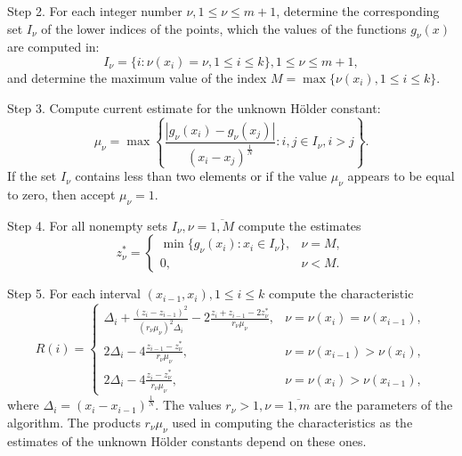 \documentclass[runningheads]{llncs}
\begin{document}
Step 2. For each integer number \(\nu ,1\leqslant \nu \leqslant m+1\), determine the corresponding
set \(I_{\nu }\) of the lower indices of the points, which the values of the functions \(g_{\nu
}(x)\) are computed in:
\begin{displaymath}
  I_{\nu }=\{i:\nu (x_{i})=\nu ,1\leqslant i\leqslant k\},1\leq \nu \leqslant m+1,
\end{displaymath}
and determine the maximum value of the index \(M=\max\{\nu (x_{i}),1\leq i\leq k\}\).

Step 3. Compute current estimate for the unknown H\"{o}lder constant:
\begin{equation}
  \label{step2}
  \mu _{\nu }=\max \left\{ \frac{|g_{\nu }(x_{i})-g_{\nu }(x_{j})|}{(x_{i}-
x_{j})^{\frac{1}{N}}}:i,j\in I_{\nu },i>j \right\}.
\end{equation}
If the set \(I_{\nu }\) contains less than two elements or if the value \(\mu _{\nu }\) appears to
be equal to zero, then accept \(\mu _{\nu }=1\).

Step 4. For all nonempty sets \(I_{\nu },\nu ={\overline {1,M}}\) compute the estimates
\begin{equation}
  \label{eq:step_4}
  z_{\nu }^{*}={\begin{cases}\min\{g_{\nu }(x_{i}):x_{i}\in I_{\nu }\},&\nu =M,\\
  0,&\nu <M.\end{cases}}
\end{equation}

Step 5. For each interval \((x_{i-1},x_{i}),1\leqslant i\leqslant k\) compute the characteristic
\begin{equation}
  \label{step3_1}
  R(i)={\begin{cases}\Delta _{i}+{\frac {(z_{i}-z_{i-1})^{2}}{(r_{\nu }\mu _{\nu
})^{2}\Delta _{i}}}-2{\frac {z_{i}+z_{i-1}-2z_{\nu }^{*}}{r_{\nu }\mu _{\nu }}},&\nu =\nu
(x_{i})=\nu (x_{i-1}),\\2\Delta _{i}-4{\frac {z_{i-1}-z_{\nu }^{*}}{r_{\nu }\mu _{\nu
}}},&\nu =\nu (x_{i-1})>\nu (x_{i}),\\2\Delta _{i}-4{\frac {z_{i}-z_{\nu }^{*}}{r_{\nu }\mu
_{\nu }}},&\nu =\nu (x_{i})>\nu (x_{i-1}),\end{cases}}
\end{equation}
where \(\Delta_{i}=(x_{i}-x_{i-1})^{\frac{1}{N}}\).
The values \(r_{\nu }>1,\nu ={\overline {1,m}}\) are the parameters of the algorithm.
The products \(r_{\nu}\mu_{\nu}\) used in computing the characteristics as the estimates of the
unknown H\"{o}lder constants depend on these ones.
\end{document}
